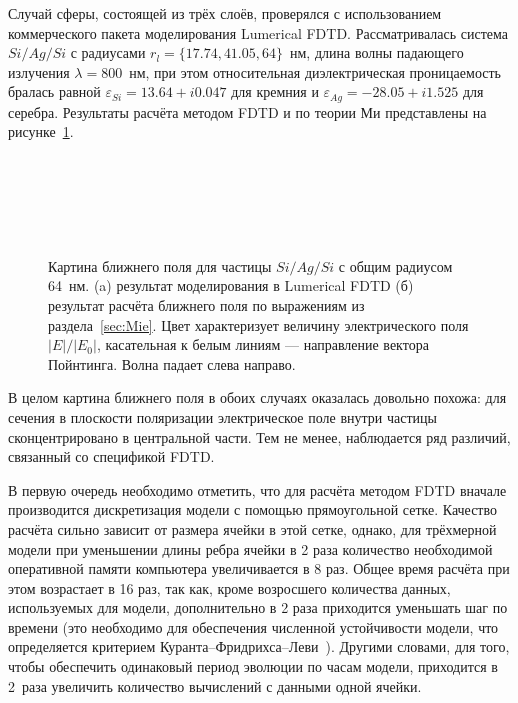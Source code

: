 Случай сферы, состоящей из трёх слоёв, проверялся с использованием
коммерческого пакета моделирования Lumerical FDTD. Рассматривалась
система $Si/Ag/Si$ с радиусами $r_l=\{17.74, 41.05, 64\}$~нм, длина
волны падающего излучения $\lambda = 800$~нм, при этом относительная
диэлектрическая проницаемость бралась равной
$\varepsilon_{Si} = 13.64 + i 0.047$ для кремния и
$\varepsilon_{Ag} = -28.05 + i 1.525$ для серебра.  Результаты расчёта
методом FDTD и по теории Ми представлены на рисунке~\ref{img:fdtd}.
\begin{figure}[p] 
  \begin{minipage}[ht]{0.99\linewidth}
  \end{minipage}\\
  \vfill
  \begin{minipage}[ht]{0.99\linewidth}
  \end{minipage}\\
  \vfill
  \begin{minipage}[ht]{0.99\linewidth}
  \end{minipage}\\
  \vfill
  \begin{minipage}[ht]{0.99\linewidth}
  \end{minipage}
  \caption{Картина ближнего поля для частицы $Si/Ag/Si$ с общим
    радиусом 64~нм. (a) результат моделирования в Lumerical FDTD (б)
    результат расчёта ближнего поля по выражениям из
    раздела~\ref{sec:Mie}. Цвет характеризует величину электрического
    поля $|E|/|E_0|$, касательная к белым линиям --- направление
    вектора Пойнтинга. Волна падает слева направо.\label{img:fdtd}}
\end{figure}

В целом картина ближнего поля в обоих случаях оказалась довольно
похожа: для сечения в плоскости поляризации электрическое поле внутри
частицы сконцентрировано в центральной части. Тем не менее,
наблюдается ряд различий, связанный со спецификой FDTD.

В первую очередь необходимо отметить, что для расчёта методом FDTD
вначале производится дискретизация модели с помощью прямоугольной
сетке. Качество расчёта сильно зависит от размера ячейки в этой сетке,
однако, для трёхмерной модели при уменьшении длины ребра ячейки в 2
раза количество необходимой оперативной памяти компьютера
увеличивается в 8 раз.  Общее время расчёта при этом возрастает в 16
раз, так как, кроме возросшего количества данных, используемых для
модели, дополнительно в 2 раза приходится уменьшать шаг по времени
(это необходимо для обеспечения численной устойчивости модели, что
определяется критерием
Куранта--Фридрихса--Леви~\cite{Courant-1941}). Другими словами, для
того, чтобы обеспечить одинаковый период эволюции по часам модели,
приходится в 2~раза увеличить количество вычислений с данными одной
ячейки.

